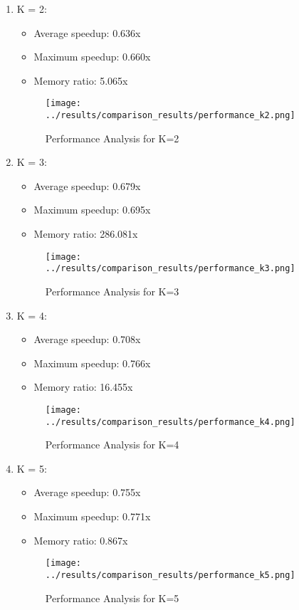 \documentclass{article}
\begin{document}
\begin{enumerate}
    \item K = 2:
    \begin{itemize}
        \item Average speedup: 0.636x
        \item Maximum speedup: 0.660x
        \item Memory ratio: 5.065x
    \end{itemize}
    \begin{figure}[h]
        \centering
        \texttt{[image: ../results/comparison\_results/performance\_k2.png]}
        \caption{Performance Analysis for K=2}
        \label{fig:perf_k2}
    \end{figure}

    \item K = 3:
    \begin{itemize}
        \item Average speedup: 0.679x
        \item Maximum speedup: 0.695x
        \item Memory ratio: 286.081x
    \end{itemize}
    \begin{figure}[h]
        \centering
        \texttt{[image: ../results/comparison\_results/performance\_k3.png]}
        \caption{Performance Analysis for K=3}
        \label{fig:perf_k3}
    \end{figure}

    \item K = 4:
    \begin{itemize}
        \item Average speedup: 0.708x
        \item Maximum speedup: 0.766x
        \item Memory ratio: 16.455x
    \end{itemize}
    \begin{figure}[h]
        \centering
        \texttt{[image: ../results/comparison\_results/performance\_k4.png]}
        \caption{Performance Analysis for K=4}
        \label{fig:perf_k4}
    \end{figure}

    \item K = 5:
    \begin{itemize}
        \item Average speedup: 0.755x
        \item Maximum speedup: 0.771x
        \item Memory ratio: 0.867x
    \end{itemize}
    \begin{figure}[h]
        \centering
        \texttt{[image: ../results/comparison\_results/performance\_k5.png]}
        \caption{Performance Analysis for K=5}
        \label{fig:perf_k5}
    \end{figure}
\end{enumerate}
\end{document}
